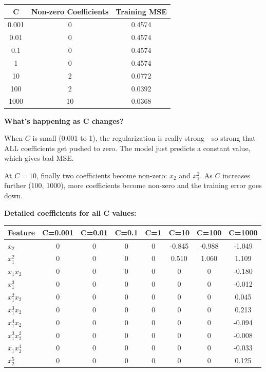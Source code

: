 \documentclass[11pt,a4paper]{article}
\begin{document}
\begin{table}[H]
\centering
\begin{tabular}{ccc}
\toprule
C & Non-zero Coefficients & Training MSE \\
\midrule
0.001 & 0 & 0.4574 \\
0.01 & 0 & 0.4574 \\
0.1 & 0 & 0.4574 \\
1 & 0 & 0.4574 \\
10 & 2 & 0.0772 \\
100 & 2 & 0.0392 \\
1000 & 10 & 0.0368 \\
\bottomrule
\end{tabular}
\end{table}

\textbf{What's happening as C changes?}

When $C$ is small (0.001 to 1), the regularization is really strong - so strong that ALL coefficients get pushed to zero. The model just predicts a constant value, which gives bad MSE.

At $C=10$, finally two coefficients become non-zero: $x_2$ and $x_1^2$. As $C$ increases further (100, 1000), more coefficients become non-zero and the training error goes down.

\textbf{Detailed coefficients for all C values:}

\begin{table}[H]
\centering
\small
\begin{tabular}{lccccccc}
\toprule
Feature & C=0.001 & C=0.01 & C=0.1 & C=1 & C=10 & C=100 & C=1000 \\
\midrule
$x_2$ & 0 & 0 & 0 & 0 & -0.845 & -0.988 & -1.049 \\
$x_1^2$ & 0 & 0 & 0 & 0 & 0.510 & 1.060 & 1.109 \\
$x_1x_2$ & 0 & 0 & 0 & 0 & 0 & 0 & -0.180 \\
$x_1^3$ & 0 & 0 & 0 & 0 & 0 & 0 & -0.012 \\
$x_1^2x_2$ & 0 & 0 & 0 & 0 & 0 & 0 & 0.045 \\
$x_1^3x_2$ & 0 & 0 & 0 & 0 & 0 & 0 & 0.213 \\
$x_1^4x_2$ & 0 & 0 & 0 & 0 & 0 & 0 & -0.094 \\
$x_1^3x_2^2$ & 0 & 0 & 0 & 0 & 0 & 0 & -0.008 \\
$x_1x_2^4$ & 0 & 0 & 0 & 0 & 0 & 0 & -0.033 \\
$x_2^5$ & 0 & 0 & 0 & 0 & 0 & 0 & 0.125 \\
\bottomrule
\end{tabular}
\end{table}
\end{document}
